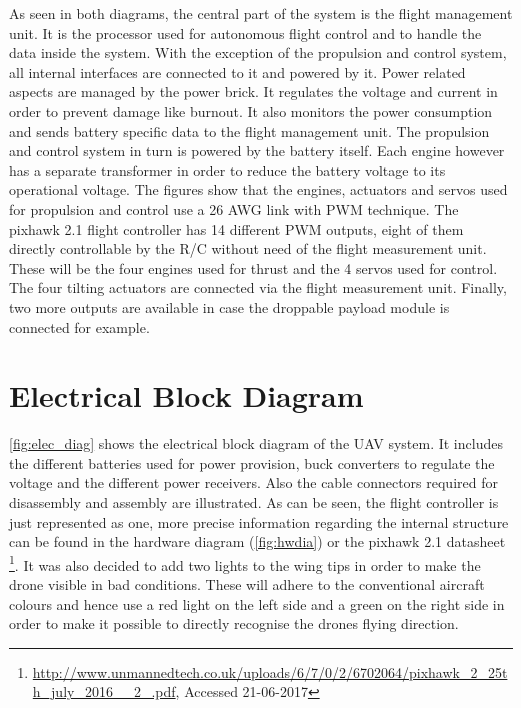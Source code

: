 As seen in both diagrams, the central part of the system is the flight management unit. It is the processor used for autonomous flight control and to handle the data inside the system. With the exception of the propulsion and control system, all internal interfaces are connected to it and powered by it. Power related aspects are managed by the power brick. It regulates the voltage and current in order to prevent damage like burnout. It also monitors the power consumption and sends battery specific data to the flight management unit. 
The propulsion and control system in turn is powered by the battery itself. Each engine however has a separate transformer in order to reduce the battery voltage to its operational voltage. The figures show that the engines, actuators and servos used for propulsion and control use a 26 AWG link with PWM technique. The pixhawk 2.1 flight controller has 14 different PWM outputs, eight of them directly controllable by the R/C without need of the flight measurement unit. These will be the four engines used for thrust and the 4 servos used for control. The four tilting actuators are connected via the flight measurement unit. Finally, two more outputs are available in case the droppable payload module is connected for example. 

\section{Electrical Block Diagram}
\label{sec:elec_bloc_diag}



\autoref{fig:elec_diag} shows the electrical block diagram of the UAV system. It includes the different batteries used for power provision, buck converters to regulate the voltage and the different power receivers. Also the cable connectors required for disassembly and assembly are illustrated. As can be seen, the flight controller is just represented as one, more precise information regarding the internal structure can be found in the hardware diagram (\autoref{fig:hwdia}) or the pixhawk 2.1 datasheet \footnote{\url{http://www.unmannedtech.co.uk/uploads/6/7/0/2/6702064/pixhawk_2_25th_july_2016__2_.pdf}, Accessed 21-06-2017}. It was also decided to add two lights to the wing tips in order to make the drone visible in bad conditions. These will adhere to the conventional aircraft colours and hence use a red light on the left side and a green on the right side in order to make it possible to directly recognise the drones flying direction.

